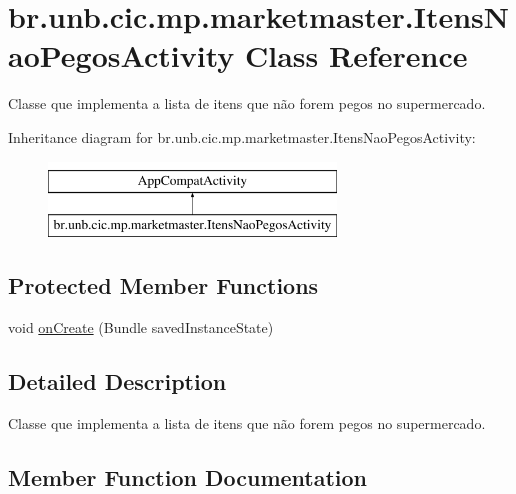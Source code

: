 \hypertarget{classbr_1_1unb_1_1cic_1_1mp_1_1marketmaster_1_1ItensNaoPegosActivity}{}\section{br.\+unb.\+cic.\+mp.\+marketmaster.\+Itens\+Nao\+Pegos\+Activity Class Reference}
\label{classbr_1_1unb_1_1cic_1_1mp_1_1marketmaster_1_1ItensNaoPegosActivity}


Classe que implementa a lista de itens que não forem pegos no supermercado.  


Inheritance diagram for br.\+unb.\+cic.\+mp.\+marketmaster.\+Itens\+Nao\+Pegos\+Activity\+:\begin{figure}[H]
\begin{center}
\leavevmode
\includegraphics[height=2.000000cm]{classbr_1_1unb_1_1cic_1_1mp_1_1marketmaster_1_1ItensNaoPegosActivity}
\end{center}
\end{figure}
\subsection*{Protected Member Functions}
\begin{DoxyCompactItemize}
\item 
void \mbox{\hyperlink{classbr_1_1unb_1_1cic_1_1mp_1_1marketmaster_1_1ItensNaoPegosActivity_a913d6cc42edaab5dbf3ccca4d133b6cb}{on\+Create}} (Bundle saved\+Instance\+State)
\end{DoxyCompactItemize}


\subsection{Detailed Description}
Classe que implementa a lista de itens que não forem pegos no supermercado. 

\subsection{Member Function Documentation}
\mbox{\label{classbr_1_1unb_1_1cic_1_1mp_1_1marketmaster_1_1ItensNaoPegosActivity_a913d6cc42edaab5dbf3ccca4d133b6cb}} 
